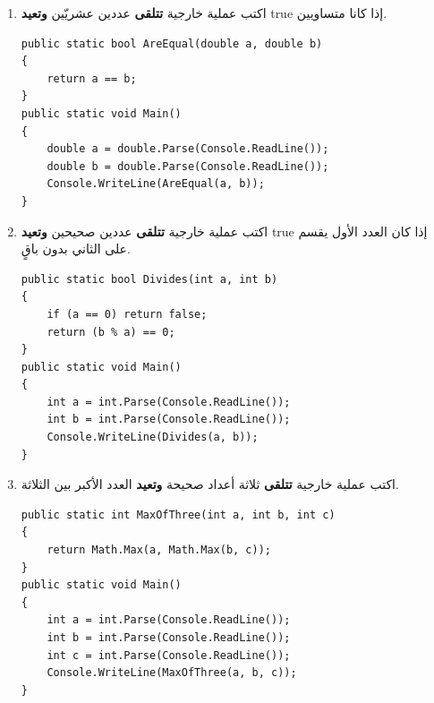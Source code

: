 ﻿\documentclass[12pt]{article}
\begin{document}
\begin{enumerate}[itemsep=3em]
\begin{enumerate}
\item اكتب عملية خارجية \textbf{تتلقى} عددين عشريّين \textbf{وتعيد} \textenglish{true} إذا كانا متساويين.
\ifwithsols
\begin{boxSolution}
\begin{english}
\begin{verbatim}
public static bool AreEqual(double a, double b)
{
    return a == b;
}
public static void Main()
{
    double a = double.Parse(Console.ReadLine());
    double b = double.Parse(Console.ReadLine());
    Console.WriteLine(AreEqual(a, b));
}
\end{verbatim}
\end{english}
\end{boxSolution}
\fi


\item اكتب عملية خارجية \textbf{تتلقى} عددين صحيحين \textbf{وتعيد} \textenglish{true} إذا كان العدد الأول يقسم على الثاني بدون باقٍ.
\ifwithsols
\begin{boxSolution}
\begin{english}
\begin{verbatim}
public static bool Divides(int a, int b)
{
    if (a == 0) return false;
    return (b % a) == 0;
}
public static void Main()
{
    int a = int.Parse(Console.ReadLine());
    int b = int.Parse(Console.ReadLine());
    Console.WriteLine(Divides(a, b));
}
\end{verbatim}
\end{english}
\end{boxSolution}
\fi


\item اكتب عملية خارجية \textbf{تتلقى} ثلاثة أعداد صحيحة \textbf{وتعيد} العدد الأكبر بين الثلاثة.
\ifwithsols
\begin{boxSolution}
\begin{english}
\begin{verbatim}
public static int MaxOfThree(int a, int b, int c)
{
    return Math.Max(a, Math.Max(b, c));
}
public static void Main()
{
    int a = int.Parse(Console.ReadLine());
    int b = int.Parse(Console.ReadLine());
    int c = int.Parse(Console.ReadLine());
    Console.WriteLine(MaxOfThree(a, b, c));
}
\end{verbatim}
\end{english}
\end{boxSolution}
\fi



\end{enumerate}
\end{enumerate}
\end{document}
